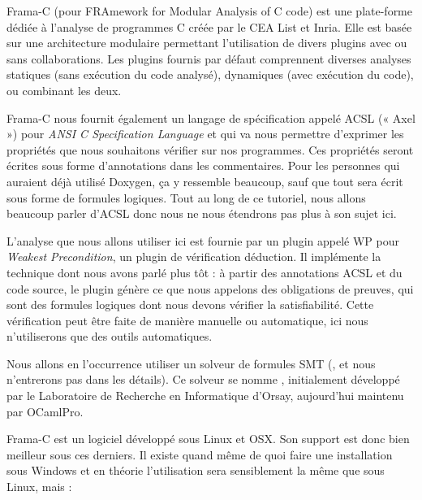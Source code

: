 





Frama-C (pour FRAmework for Modular Analysis of C code) est une plate-forme
 dédiée à l'analyse de programmes C créée par le CEA List et Inria. Elle est 
 basée sur une architecture modulaire permettant l'utilisation de divers 
 plugins avec ou sans collaborations. Les plugins fournis par défaut 
 comprennent diverses analyses statiques (sans exécution du code analysé), 
 dynamiques (avec exécution du code), ou combinant les deux.


 

Frama-C nous fournit également un langage de spécification appelé ACSL (« Axel »)
pour \textit{ANSI C Specification Language} et qui va nous permettre d'exprimer les 
propriétés que nous souhaitons vérifier sur nos programmes. Ces propriétés seront
écrites sous forme d'annotations dans les commentaires. Pour les personnes qui 
auraient déjà utilisé Doxygen, ça y ressemble beaucoup, sauf que tout sera 
écrit sous forme de formules logiques. Tout au long de ce tutoriel, nous allons 
beaucoup parler d'ACSL donc nous ne nous étendrons pas plus à son sujet ici.



L'analyse que nous allons utiliser ici est fournie par un plugin appelé WP pour
\textit{Weakest Precondition}, un plugin de vérification déduction. Il implémente
la technique dont nous avons parlé plus tôt : 
à partir des annotations ACSL et du code source, le plugin génère ce que nous 
appelons des obligations de preuves, qui sont des formules logiques dont nous
devons vérifier la satisfiabilité. Cette vérification peut être faite de manière 
manuelle ou automatique, ici nous n'utiliserons que des outils automatiques.



Nous allons en l'occurrence utiliser un solveur de formules SMT
(,
et nous n'entrerons pas dans les détails). Ce solveur se nomme 
, initialement développé par le Laboratoire
de Recherche en Informatique d'Orsay, aujourd'hui maintenu par
OCamlPro.





Frama-C est un logiciel développé sous Linux et OSX. Son support est donc bien
meilleur sous ces derniers. Il existe quand même de quoi faire une installation 
sous Windows et en théorie l'utilisation sera sensiblement la même que sous 
Linux, mais :



